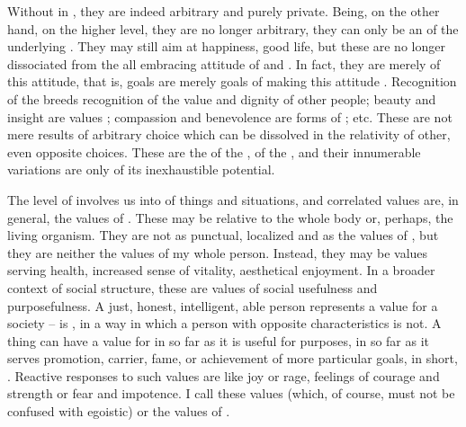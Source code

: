 {Without  in , they are indeed arbitrary 
and purely private. Being, on the other hand,  on the 
higher level, they are no longer arbitrary, they can only be an 
 of the underlying . They may still aim at 
 happiness,  good life, but these are no longer 
dissociated from the all embracing attitude of  and 
. In fact, they are merely  of this 
attitude, that is,  goals are merely goals of making this 
attitude . 
Recognition of the  breeds recognition of the value 
and dignity of other people; beauty and insight are values 
 ; compassion and benevolence are forms of 
; etc. These are not mere results of  arbitrary 
choice which can be dissolved in the relativity of other, even opposite 
choices. These are the  of the , of the 
, and their innumerable variations are only 
 of its inexhaustible potential.


\pa \act The level of  involves us into 
of things and situations, and correlated values are, in general, the
values of .  These may be relative to the whole body
or, perhaps, the living organism.  They are not as punctual,
localized and  as the  values of 
, but they are neither the values of my whole person.  Instead,
they may be values serving health, increased sense of vitality, 
aesthetical enjoyment.  In a
broader context of social structure, these are values of social
usefulness and purposefulness.  A just, honest, intelligent, able
 person represents a value for a society -- is ,
in a way in which a person with opposite characteristics is not. A 
thing can have a value for  in so far as it is useful for  
purposes, in so far as it serves  promotion,  carrier, 
 fame, 
or achievement of more particular goals, in short,  
. 
Reactive responses to such values are  like joy or 
 rage, feelings of courage and strength or fear and impotence.
I call these values  (which, of course, must not be 
confused with egoistic) or the values of 
. 

}
